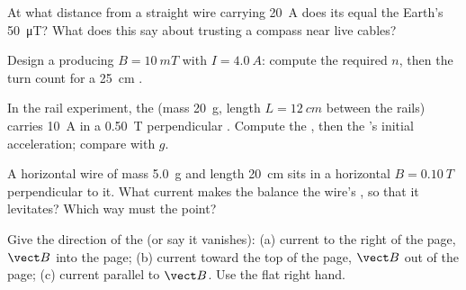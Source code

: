 \begin{exercise}[$\star\star$]\label{exo:g11:magnetic-fields:7}
At what distance from a straight wire carrying \qty{20}{A} does its
 equal the Earth's \qty{50}{\micro T}? What does this say about
trusting a compass near live cables?
\end{exercise}

\begin{exercise}[$\star\star$]\label{exo:g11:magnetic-fields:8}
Design a  producing $B = \qty{10}{mT}$ with $I = \qty{4.0}{A}$:
compute the required $n$, then the turn count for a \qty{25}{cm} .
\end{exercise}

\begin{exercise}[$\star\star$]\label{exo:g11:magnetic-fields:9}
In the rail experiment, the  (mass \qty{20}{g}, length
$L = \qty{12}{cm}$ between the rails) carries \qty{10}{A} in a
\qty{0.50}{T} perpendicular . Compute the , then the
's initial acceleration; compare with $g$.
\end{exercise}

\begin{exercise}[$\star\star$]\label{exo:g11:magnetic-fields:10}
A horizontal wire of mass \qty{5.0}{g} and length \qty{20}{cm} sits in
a horizontal  $B = \qty{0.10}{T}$ perpendicular to it. What
current makes the  balance the wire's , so that it
levitates? Which way must the  point?
\end{exercise}

\begin{exercise}[$\star\star$]\label{exo:g11:magnetic-fields:11}
Give the direction of the  (or say it vanishes):
(a) current to the right of the page, $\vect B$ into the page;
(b) current toward the top of the page, $\vect B$ out of the page;
(c) current parallel to $\vect B$. Use the flat right hand.
\end{exercise}

